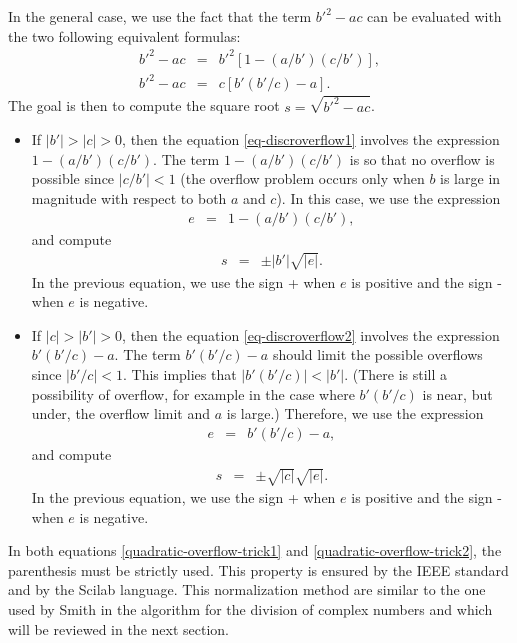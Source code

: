 In the general case, we use the fact that the term $b'^2-ac$ can be 
evaluated with the two following equivalent formulas:
\begin{eqnarray}
b'^2-ac &=& b'^2\left[1-(a/b')(c/b')\right], \label{eq-discroverflow1}\\
b'^2-ac &=& c\left[b'(b'/c) - a\right].\label{eq-discroverflow2}
\end{eqnarray}
The goal is then to compute the square root $s = \sqrt{b'^2-ac}$.
\begin{itemize}
\item If $|b'|>|c|>0$, then the equation \ref{eq-discroverflow1} involves the expression $1-(a/b')(c/b')$.
The term $1-(a/b')(c/b')$ is so that no overflow is possible since $|c/b'| < 1$ (the overflow problem occurs
only when $b$ is large in magnitude with respect to both $a$ and $c$).
In this case, we use the expression
\begin{eqnarray}
e &=& 1-(a/b')(c/b'),
\end{eqnarray}
and compute
\begin{eqnarray}
\label{quadratic-overflow-trick1}
s &=& \pm|b'|\sqrt{|e|}.
\end{eqnarray}
In the previous equation, we use the sign + when $e$ is positive
and the sign - when $e$ is negative.

\item If $|c|>|b'|>0$, then the equation \ref{eq-discroverflow2} involves the expression $b'(b'/c) - a$.
The term $b'(b'/c) - a$ should limit the possible overflows since $|b'/c| < 1$. This implies that 
$\left|b'(b'/c)\right|<|b'|$. (There is 
still a possibility of overflow, for example in the case where $b'(b'/c)$
is near, but under, the overflow limit and $a$ is large.)
Therefore, we use the expression
\begin{eqnarray}
e &=& b'(b'/c) - a,
\end{eqnarray}
and compute 
\begin{eqnarray}
\label{quadratic-overflow-trick2}
s &=& \pm\sqrt{|c|} \sqrt{|e|}.
\end{eqnarray}
In the previous equation, we use the sign + when $e$ is positive
and the sign - when $e$ is negative.
\end{itemize}
In both equations \ref{quadratic-overflow-trick1} and \ref{quadratic-overflow-trick2}, 
the parenthesis must be strictly used. This property is ensured by the IEEE standard 
and by the Scilab language. 
This normalization method are similar to the one used by Smith in the 
algorithm for the division of complex numbers \cite{Smith1962} and 
which will be reviewed in the next section.



